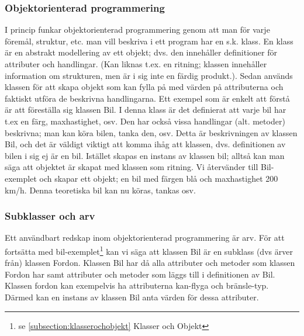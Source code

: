 \documentclass[12pt,a4paper]{article}
\begin{document}
\subsubsection{Objektorienterad programmering}
I princip funkar objektorienterad programmering genom att man för varje föremål, struktur, etc. man vill beskriva i ett program har en s.k. klass. En klass är en abstrakt modellering av ett objekt; dvs. den innehåller definitioner för attributer och handlingar. (Kan liknas t.ex. en ritning; klassen innehåller information om strukturen, men är i sig inte en färdig produkt.). Sedan används klassen för att skapa objekt som kan fylla på med värden på attributerna och faktiskt utföra de beskrivna handlingarna. Ett exempel som är enkelt att förstå är att föreställa sig klassen Bil. I denna klass är det definierat att varje bil har t.ex en färg, maxhastighet, osv. Den har också vissa handlingar (alt. metoder) beskrivna; man kan köra bilen, tanka den, osv. Detta är beskrivningen av klassen Bil, och det är väldigt viktigt att komma ihåg att klassen, dvs. definitionen av bilen i sig ej är en bil. Istället skapas en instans av klassen bil; alltså kan man säga att objektet är skapat med klassen som ritning. Vi återvänder till Bil-exemplet och skapar ett objekt; en bil med färgen blå och maxhastighet 200 km/h. Denna teoretiska bil kan nu köras, tankas osv.
\subsubsection{Subklasser och arv}
Ett användbart redskap inom objektorienterad programmering är arv. För att fortsätta med bil-exemplet\footnote{se \ref{subsection:klasserochobjekt} Klasser och Objekt} kan vi säga att klassen Bil är en subklass (dvs ärver från) klassen Fordon. Klassen Bil har då alla attributer och metoder som klassen Fordon har samt attributer och metoder som läggs till i definitionen av Bil. Klassen fordon kan exempelvis ha attributerna kan-flyga och bränsle-typ. Därmed kan en instans av klassen Bil anta värden för dessa attributer.
\end{document}
